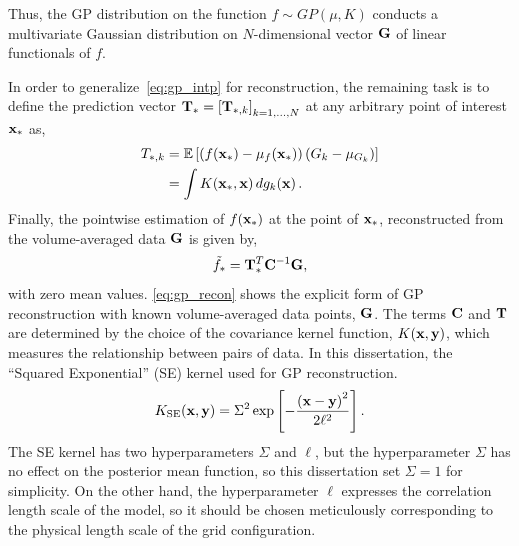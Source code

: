 Thus, the GP distribution on the function \( f \sim GP(\mu, K) \) conducts a multivariate
Gaussian distribution on \( N \)-dimensional vector \( \mathbf{G} \) of linear functionals of \( f \).

In order to generalize~\cref{eq:gp_intp} for reconstruction, the remaining task is to define
the prediction vector \( \mathbf{T}_{*} = \left[ \mathbf{T}_{*,k} \right]_{k = 1, \dots, N} \)
at any arbitrary point of interest \( \mathbf{x}_{*} \) as,
\begin{equation}\label{eq:gp_pred_vec}
    \begin{split}
        T_{*, k} &= \mathbb{E} \left[ \left( f(\mathbf{x}_{*}) - \mu_{f}(\mathbf{x}_{*}) \right) \left( G_{k} - \mu_{G_{k}} \right) \right] \\
                 &= \int K (\mathbf{x}_{*}, \mathbf{x}) \mathop{d g_{k} (\mathbf{x})}.
    \end{split}
\end{equation}
Finally, the pointwise estimation of \( f(\mathbf{x}_{*}) \) at the point of \( \mathbf{x}_{*} \),
reconstructed from the volume-averaged data \( \mathbf{G} \) is given by,
\begin{equation}\label{eq:gp_recon}
    \tilde{f}_{*} = \mathbf{T}_{*}^{T} \mathbf{C}^{-1} \mathbf{G},
\end{equation}
with zero mean values. \cref{eq:gp_recon} shows the explicit form of GP reconstruction
with known volume-averaged data points, \( \mathbf{G} \). The terms \( \mathbf{C} \) and \( \mathbf{T} \) are determined by
the choice of the covariance kernel function, \( K(\mathbf{x}, \mathbf{y}) \), which measures the relationship between pairs of data.
In this dissertation, the ``Squared Exponential'' (SE) kernel used for GP reconstruction.
\begin{equation}\label{eq:gp_se_kernel}
    K_{\text{SE}} (\mathbf{x}, \mathbf{y}) = \Sigma^{2} \exp \left[ -\frac{\left( \mathbf{x} - \mathbf{y} \right)^{2}}{2 \ell^{2}} \right].
\end{equation}
The SE kernel has two hyperparameters \( \Sigma \) and \( \ell \),
but the hyperparameter \( \Sigma \) has no effect on the posterior mean function,
so this dissertation set \( \Sigma = 1 \) for simplicity.
On the other hand, the hyperparameter \( \ell \) expresses the correlation length scale of the model,
so it should be chosen meticulously corresponding to the physical length scale of the grid configuration.

